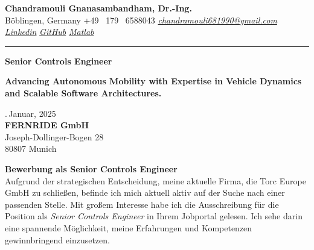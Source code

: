 \documentclass[a4paper,10pt]{article}
\newcommand{\link}[1]{{\textit{#1}}}
\begin{document}
\thispagestyle{plain}

\begin{center}
    {\Large \textbf{Chandramouli Gnanasambandham, Dr.-Ing.}}\\ 
    
    \vspace{0.2cm}
    \small B\"oblingen, Germany \hfill  \bullet  \hfill  +49 \ 179 \ 6588043 \hfill \bullet  \hfill
    \textup{\href{mailto:chandramouli681990@gmail.com}{\link{chandramouli681990@gmail.com}}} \hfill \bullet \hfill
    \textup{\href{https://linkedin.com/in/ganasambandhamc}{\link{Linkedin}}} \hfill \bullet \hfill
    \textup{\href{https://github.com/chandramouli6890}{\link{GitHub}}} \hfill \bullet \hfill
    \textup{\href{https://de.mathworks.com/matlabcentral/profile/authors/4267772}{\link{Matlab}}}

    \vspace{-0.2cm}
    {\rule{\linewidth}{0.8pt}}

    \vspace{0.2cm}
    {\Large \textbf{Senior Controls Engineer}}
    
    \vspace{0.1cm}
    \colorbox{gray!40}{%
        \parbox{0.99\textwidth}{%
            \centering \textcolor{highlightcolor}{\textbf{Advancing Autonomous Mobility with Expertise in Vehicle Dynamics and Scalable Software Architectures.}}
        }%
    }
\end{center}

\vspace{0.5cm}
.\,Januar, 2025\\

{\noindent
\textbf{FERNRIDE GmbH}\\
Joseph-Dollinger-Bogen 28\\
80807 Munich\\
}

\noindent \textbf{Bewerbung als Senior Controls Engineer} \\

\noindent Aufgrund der strategischen Entscheidung, meine aktuelle Firma, die
Torc Europe GmbH zu schließen, befinde ich mich aktuell aktiv auf der Suche
nach einer passenden Stelle. Mit großem Interesse habe ich die Ausschreibung
für die Position als \textit{Senior Controls Engineer} in Ihrem Jobportal
gelesen. Ich sehe darin eine spannende Möglichkeit, meine Erfahrungen und
Kompetenzen gewinnbringend einzusetzen. \\
\end{document}
